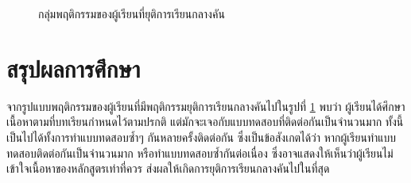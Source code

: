 \documentclass[conference]{IEEEtran}
\def\dropout{ยุติการเรียนกลางคัน}
\begin{document}
    \begin{figure}[htbp]
        \caption{กลุ่มพฤติกรรมของผู้เรียนที่{\dropout}}
        \label{fig:dropout-community}
    \end{figure}

    \section[conclusions]{สรุปผลการศึกษา}
    จากรูปแบบพฤติกรรมของผู้เรียนที่มีพฤติกรรม{\dropout}ไปในรูปที่ \ref{fig:dropout-community}
    พบว่า ผู้เรียนได้ศึกษาเนื้อหาตามที่บทเรียนกำหนดไว้ตามปรกติ แต่มักจะเจอกับแบบทดสอบที่ติดต่อกันเป็นจำนวนมาก
    ทั้งนี้เป็นไปได้ทั้งการทำแบบทดสอบซ้ำๆ กันหลายครั้งติดต่อกัน ซึ่งเป็นข้อสังเกตได้ว่า 
    หากผู้เรียนทำแบบทดสอบติดต่อกันเป็นจำนวนมาก หรือทำแบบทดสอบซ้ำกันต่อเนื่อง
    ซึ่งอาจแสดงให้เห็นว่าผู้เรียนไม่เข้าใจเนื้อหาของหลักสูตรเท่าที่ควร 
    ส่งผลให้เกิดการยุติการเรียนกลางคันไปในที่สุด

    
    
\end{document}
